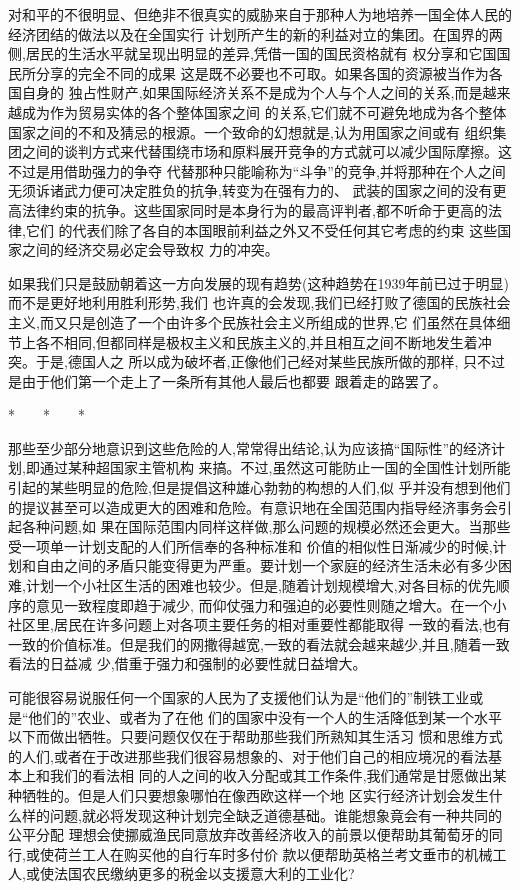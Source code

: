﻿\documentclass[12pt]{article}
\begin{document}
对和平的不很明显、但绝非不很真实的威胁来自于那种人为地培养一国全体人民的经济团结的做法以及在全国实行
计划所产生的新的利益对立的集团。在国界的两侧,居民的生活水平就呈现出明显的差异,凭借一国的国民资格就有
权分享和它国国民所分享的完全不同的成果 \myrule 这是既不必要也不可取。如果各国的资源被当作为各国自身的
独占性财产,如果国际经济关系不是成为个人与个人之间的关系,而是越来越成为作为贸易实体的各个整体国家之间
的关系,它们就不可避免地成为各个整体国家之间的不和及猜忌的根源。一个致命的幻想就是,认为用国家之间或有
组织集团之间的谈判方式来代替围绕市场和原料展开竞争的方式就可以减少国际摩擦。这不过是用借助强力的争夺
代替那种只能喻称为``斗争''的竞争,并将那种在个人之间无须诉诸武力便可决定胜负的抗争,转变为在强有力的、
武装的国家之间的没有更高法律约束的抗争。这些国家同时是本身行为的最高评判者,都不听命于更高的法律,它们
的代表们除了各自的本国眼前利益之外又不受任何其它考虑的约束 \myrule 这些国家之间的经济交易必定会导致权
力的冲突。

如果我们只是鼓励朝着这一方向发展的现有趋势(这种趋势在1939年前已过于明显)而不是更好地利用胜利形势,我们
也许真的会发现,我们已经打败了德国的民族社会主义,而又只是创造了一个由许多个民族社会主义所组成的世界,它
们虽然在具体细节上各不相同,但都同样是极权主义和民族主义的,并且相互之间不断地发生着冲突。于是,德国人之
所以成为破坏者,正像他们己经对某些民族所做的那样, 只不过是由于他们第一个走上了一条所有其他人最后也都要
跟着走的路罢了。

*　　*　　*

那些至少部分地意识到这些危险的人,常常得出结论,认为应该搞``国际性''的经济计划,即通过某种超国家主管机构
来搞。不过,虽然这可能防止一国的全国性计划所能引起的某些明显的危险,但是提倡这种雄心勃勃的构想的人们,似
乎并没有想到他们的提议甚至可以造成更大的困难和危险。有意识地在全国范围内指导经济事务会引起各种问题,如
果在国际范围内同样这样做,那么问题的规模必然还会更大。当那些受一项单一计划支配的人们所信奉的各种标准和
价值的相似性日渐减少的时候,计划和自由之间的矛盾只能变得更为严重。要计划一个家庭的经济生活未必有多少困
难,计划一个小社区生活的困难也较少。但是,随着计划规模增大,对各目标的优先顺序的意见一致程度即趋于减少,
而仰仗强力和强迫的必要性则随之增大。在一个小社区里,居民在许多问题上对各项主要任务的相对重要性都能取得
一致的看法,也有一致的价值标准。但是我们的网撒得越宽,一致的看法就会越来越少,并且,随着一致看法的日益减
少,借重于强力和强制的必要性就日益增大。

可能很容易说服任何一个国家的人民为了支援他们认为是``他们的''制铁工业或是``他们的''农业、或者为了在他
们的国家中没有一个人的生活降低到某一个水平以下而做出牺牲。只要问题仅仅在于帮助那些我们所熟知其生活习
惯和思维方式的人们,或者在于改进那些我们很容易想象的、对于他们自己的相应境况的看法基本上和我们的看法相
同的人之间的收入分配或其工作条件,我们通常是甘愿做出某种牺牲的。但是人们只要想象哪怕在像西欧这样一个地
区实行经济计划会发生什么样的问题,就必将发现这种计划完全缺乏道德基础。谁能想象竟会有一种共同的公平分配
理想会使挪威渔民同意放弃改善经济收入的前景以便帮助其葡萄牙的同行,或使荷兰工人在购买他的自行车时多付价
款以便帮助英格兰考文垂市的机械工人,或使法国农民缴纳更多的税金以支援意大利的工业化?
\end{document}

